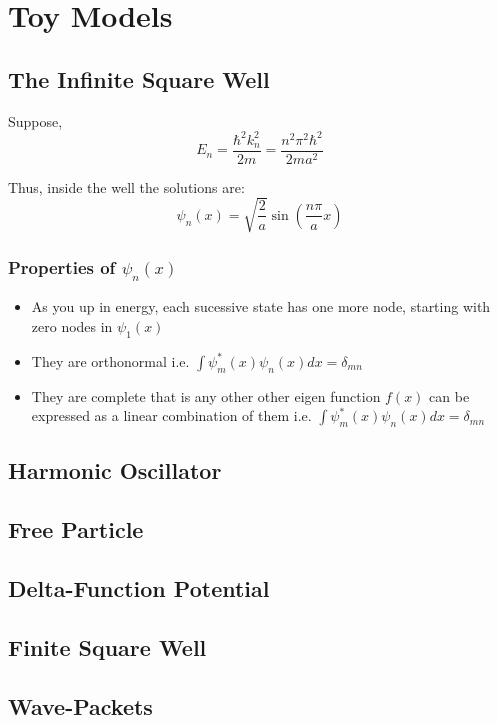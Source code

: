 \chapter{Toy Models}
\section{The Infinite Square Well}
Suppose,
\begin{equation}
E_{n} = \frac{\hbar^{2}k^{2}_{n}}{2m} = \frac{n^{2} \pi^{2} \hbar^{2}}{2m a^{2}}
\end{equation}
\begin{tcolorbox}
	Thus, inside the well the solutions are:
\begin{equation}
\psi_{n}(x) = \sqrt{\frac{2}{a}} \sin(\frac{n \pi}{a}x)
\end{equation}
\end{tcolorbox}
\subsection{Properties of $\psi_{n}(x)$}
\begin{itemize}
\item As you up in energy, each sucessive state has one more node, starting with zero nodes in $\psi_{1}(x)$
\item They are orthonormal i.e. $\int \psi^{*}_{m}(x) \psi_{n}(x) dx = \delta_{mn}$
\item They are complete that is any other other eigen function $f(x)$ can be expressed as a linear combination of them i.e. $\int \psi^{*}_{m}(x) \psi_{n}(x) dx = \delta_{mn}$
\end{itemize}
\section{Harmonic Oscillator}
\section{Free Particle}
\section{Delta-Function Potential}
\section{Finite Square Well}
\section{Wave-Packets}